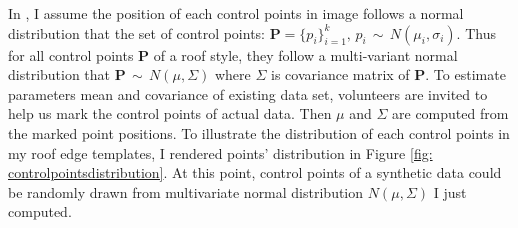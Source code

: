 \documentclass{iitthesis}
\begin{document}
In \cite{ZX:14}, I assume the position of each control points in image follows a normal distribution
that the set of control points: $\textbf{P}=\{p_i\}_{i=1}^k,\, p_i\, \sim\, N(\mu_i, \sigma_i) $. Thus for all control points $\textbf{P}$ of a roof style, they follow a multi-variant normal distribution that $\textbf{P}\, \sim\, N(\mu, \Sigma)$ where $\Sigma$ is covariance matrix of $\textbf{P}$. To estimate parameters mean and covariance of existing data set, volunteers are invited to help us mark the control points of actual data. Then $\mu$ and $\Sigma$ are computed from the marked point positions. To illustrate the distribution of each control points in my roof edge templates, I rendered points' distribution in Figure \ref{fig: controlpointsdistribution}. At this point, control points of a synthetic data could be randomly drawn from multivariate normal distribution $N(\mu, \Sigma)$ I just computed. 
\end{document}
